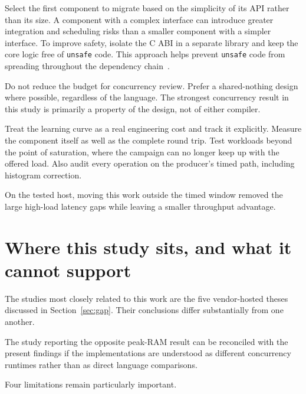 \documentclass[english,oneside,a4paper,censored,csm,software-track-2020]{HYthesisML}
\begin{document}
\begin{compactitem}
\item Select the first component to migrate based on the simplicity of its API 
rather than its size. A component with a complex interface can introduce greater 
integration and scheduling risks than a smaller component with a simpler interface. 
To improve safety, isolate the C ABI in a separate library and keep the core 
logic free of \texttt{unsafe} code. This approach helps prevent \texttt{unsafe}
code from spreading throughout the dependency chain~\cite{evans2020rust}.

\item Do not reduce the budget for concurrency review. Prefer a shared-nothing design
where possible, regardless of the language. The strongest concurrency result in
this study is primarily a property of the design, not of either compiler.

\item Treat the learning curve as a real engineering cost and track it explicitly.
Measure the component itself as well as the complete round trip. Test workloads
beyond the point of saturation, where the campaign can no longer keep up with the
offered load. Also audit every operation on the producer's timed path,
including histogram correction.

\item On the tested host, moving this work outside the timed window removed the large
high-load latency gaps while leaving a smaller throughput advantage.
\end{compactitem}

\section[Where this study sits]{Where this study sits, and what it cannot support}\label{sec:standing}
The studies most closely related to this work are the five vendor-hosted theses
discussed in Section~\ref{sec:gap}. Their conclusions differ substantially from
one another.

The study reporting the opposite peak-RAM result can be reconciled with the
present findings if the implementations are understood as different concurrency
runtimes rather than as direct language comparisons.

Four limitations remain particularly important.
\end{document}
